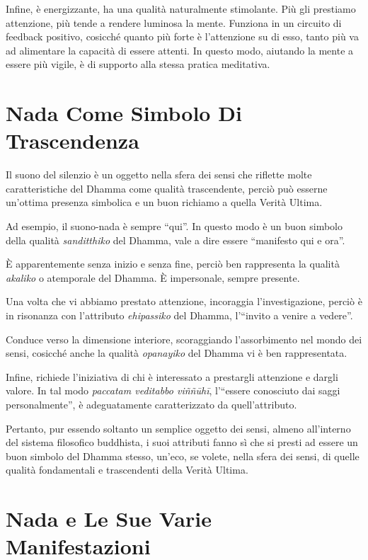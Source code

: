 Infine, è energizzante, ha una qualità naturalmente stimolante. Più gli
prestiamo attenzione, più tende a rendere luminosa la mente. Funziona in
un circuito di feedback positivo, cosicché quanto più forte è
l'attenzione su di esso, tanto più va ad alimentare la capacità di
essere attenti. In questo modo, aiutando la mente a essere più vigile, è
di supporto alla stessa pratica meditativa.

\section{Nada Come Simbolo Di Trascendenza}

Il suono del silenzio è un oggetto nella sfera dei sensi che riflette
molte caratteristiche del Dhamma come qualità trascendente, perciò può
esserne un'ottima presenza simbolica e un buon richiamo a quella Verità
Ultima.

Ad esempio, il suono-nada è sempre ``qui''. In questo modo è un buon
simbolo della qualità \emph{sanditthiko} del Dhamma, vale a dire essere
``manifesto qui e ora''.

È apparentemente senza inizio e senza fine, perciò ben rappresenta la
qualità \emph{akaliko} o atemporale del Dhamma. È impersonale, sempre
presente.

Una volta che vi abbiamo prestato attenzione, incoraggia
l'investigazione, perciò è in risonanza con l'attributo
\emph{ehipassiko} del Dhamma, l'``invito a venire a vedere''.

Conduce verso la dimensione interiore, scoraggiando l'assorbimento nel
mondo dei sensi, cosicché anche la qualità \emph{opanayiko} del Dhamma
vi è ben rappresentata.

Infine, richiede l'iniziativa di chi è interessato a prestargli
attenzione e dargli valore. In tal modo \emph{paccatam veditabbo
viññūhī}, l'``essere conosciuto dai saggi personalmente'', è
adeguatamente caratterizzato da quell'attributo.

Pertanto, pur essendo soltanto un semplice oggetto dei sensi, almeno
all'interno del sistema filosofico buddhista, i suoi attributi fanno sì
che si presti ad essere un buon simbolo del Dhamma stesso, un'eco, se
volete, nella sfera dei sensi, di quelle qualità fondamentali e
trascendenti della Verità Ultima.

\section{Nada e Le Sue Varie Manifestazioni}

